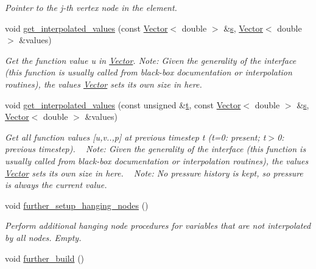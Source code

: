 \begin{DoxyCompactItemize}
\begin{DoxyCompactList}\small\item\em Pointer to the j-\/th vertex node in the element. \end{DoxyCompactList}\item 
void \hyperlink{classoomph_1_1RefineableAxisymmetricQCrouzeixRaviartElement_a1b8fceaa487bfc3e4639f4c3e8ed5695}{get\+\_\+interpolated\+\_\+values} (const \hyperlink{classoomph_1_1Vector}{Vector}$<$ double $>$ \&\hyperlink{cfortran_8h_ab7123126e4885ef647dd9c6e3807a21c}{s}, \hyperlink{classoomph_1_1Vector}{Vector}$<$ double $>$ \&values)
\begin{DoxyCompactList}\small\item\em Get the function value u in \hyperlink{classoomph_1_1Vector}{Vector}. Note\+: Given the generality of the interface (this function is usually called from black-\/box documentation or interpolation routines), the values \hyperlink{classoomph_1_1Vector}{Vector} sets its own size in here. \end{DoxyCompactList}\item 
void \hyperlink{classoomph_1_1RefineableAxisymmetricQCrouzeixRaviartElement_a7ac03518bc3b2941916e4306e83f4f48}{get\+\_\+interpolated\+\_\+values} (const unsigned \&\hyperlink{cfortran_8h_af6f0bd3dc13317f895c91323c25c2b8f}{t}, const \hyperlink{classoomph_1_1Vector}{Vector}$<$ double $>$ \&\hyperlink{cfortran_8h_ab7123126e4885ef647dd9c6e3807a21c}{s}, \hyperlink{classoomph_1_1Vector}{Vector}$<$ double $>$ \&values)
\begin{DoxyCompactList}\small\item\em Get all function values \mbox{[}u,v..,p\mbox{]} at previous timestep t (t=0\+: present; t$>$0\+: previous timestep). ~\newline
 Note\+: Given the generality of the interface (this function is usually called from black-\/box documentation or interpolation routines), the values \hyperlink{classoomph_1_1Vector}{Vector} sets its own size in here. ~\newline
Note\+: No pressure history is kept, so pressure is always the current value. \end{DoxyCompactList}\item 
void \hyperlink{classoomph_1_1RefineableAxisymmetricQCrouzeixRaviartElement_a00d870c55a1a8e6596895d4efb5b3db5}{further\+\_\+setup\+\_\+hanging\+\_\+nodes} ()
\begin{DoxyCompactList}\small\item\em Perform additional hanging node procedures for variables that are not interpolated by all nodes. Empty. \end{DoxyCompactList}\item 
void \hyperlink{classoomph_1_1RefineableAxisymmetricQCrouzeixRaviartElement_acff18b2da6b89e140fcb7bf2af3777bc}{further\+\_\+build} ()
\end{DoxyCompactItemize}
